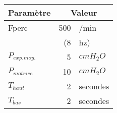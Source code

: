 	\begin{tabular}{l r l}
		\hline
		Paramètre & \multicolumn{2}{c}{Valeur}\\
		\hline
		Fperc						&500&/min\\ 
										&(8	&hz)\\
		$P_{exp. moy.}$	&5	&$cmH_2O$\\
		$P_{motrice}$		&10	&$cmH_2O$\\
		$T_{haut}$			& 2	&secondes\\
		$T_{bas}$				& 2	&secondes\\
		\hline
	\end{tabular}

